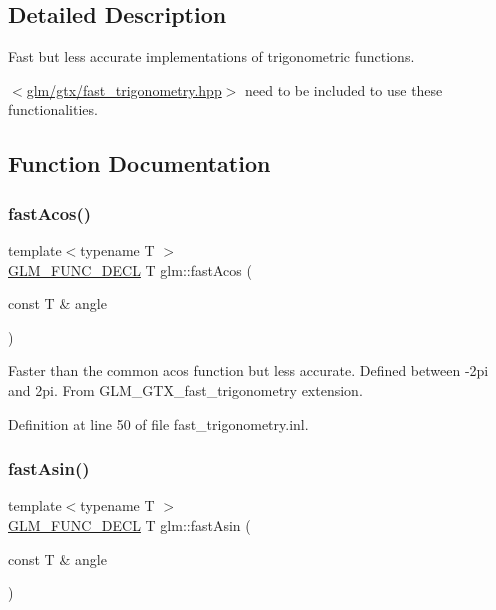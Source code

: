 \subsection{Detailed Description}
Fast but less accurate implementations of trigonometric functions. 

$<$\hyperlink{fast__trigonometry_8hpp}{glm/gtx/fast\+\_\+trigonometry.\+hpp}$>$ need to be included to use these functionalities. 

\subsection{Function Documentation}
\mbox{\label{group__gtx__fast__trigonometry_ga44e6efc3e776a51645fdf998e3e4f11b}} 
\subsubsection{\texorpdfstring{fast\+Acos()}{fastAcos()}}
{\footnotesize\ttfamily template$<$typename T $>$ \\
\hyperlink{setup_8hpp_ab2d052de21a70539923e9bcbf6e83a51}{G\+L\+M\+\_\+\+F\+U\+N\+C\+\_\+\+D\+E\+CL} T glm\+::fast\+Acos (\begin{DoxyParamCaption}\item[{const T \&}]{angle }\end{DoxyParamCaption})}

Faster than the common acos function but less accurate. Defined between -\/2pi and 2pi. From G\+L\+M\+\_\+\+G\+T\+X\+\_\+fast\+\_\+trigonometry extension. 

Definition at line 50 of file fast\+\_\+trigonometry.\+inl.

\mbox{\label{group__gtx__fast__trigonometry_gab8595a77c5b215b95f662238dc3ff722}} 
\subsubsection{\texorpdfstring{fast\+Asin()}{fastAsin()}}
{\footnotesize\ttfamily template$<$typename T $>$ \\
\hyperlink{setup_8hpp_ab2d052de21a70539923e9bcbf6e83a51}{G\+L\+M\+\_\+\+F\+U\+N\+C\+\_\+\+D\+E\+CL} T glm\+::fast\+Asin (\begin{DoxyParamCaption}\item[{const T \&}]{angle }\end{DoxyParamCaption})}

